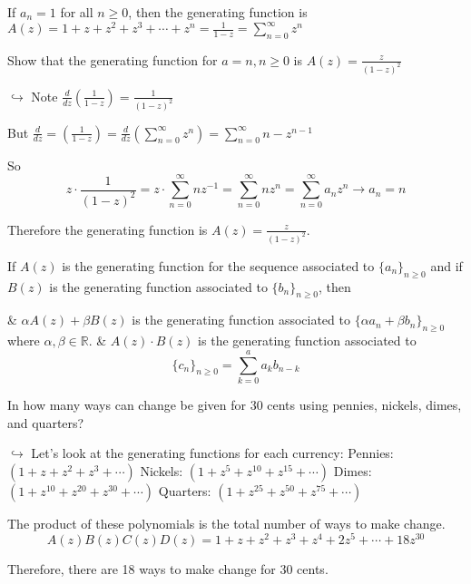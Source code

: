     \begin{ex}
        If $a_n = 1$ for all $n \ge 0$, then the generating function is $A(z) = 1 + z + z^2 + z^3 + \cdots + z^n = \frac{1}{1-z} = \sum^\infty_{n=0} z^n$
    \end{ex}

    \begin{ex}
        Show that the generating function for $a = n, n \ge 0$ is $A(z)=\frac{z}{{(1 - z)}^2}$

        $\hookrightarrow$ Note $\frac{d}{dz} \left( \frac{1}{1-z} \right) = \frac{1}{{(1 - z)}^2}$

        But $\frac{d}{dz} = \left( \frac{1}{1-z} \right) = \frac{d}{dz} \left( \sum^\infty_{n=0} z^n \right) = \sum^\infty_{n=0} n - z^{n - 1}$

        So
            \[
                z \cdot \frac{1}{{(1 - z)}^2} = z \cdot \sum^\infty_{n=0} nz^{-1} = \sum^\infty_{n = 0} nz^n = \sum^\infty_{n=0} a_n z^n \to a_n = n
            \]

        Therefore the generating function is $A(z) = \frac{z}{{(1 - z)}^2}$.
    \end{ex}

    \begin{thm}
        If $A(z)$ is the generating function for the sequence associated to $\{a_n\}_{n \ge 0}$ and if $B(z)$ is the generating function associated to $\{b_n\}_{n \ge 0}$, then
        \begin{easylist}[enumerate]
            & $\alpha A(z) + \beta B(z)$ is the generating function associated to $\{\alpha a_n + \beta b_n\}_{n \ge 0}$ where $\alpha, \beta \in \mathbb{R}$.
            & $A(z) \cdot B(z)$ is the generating function associated to
                \[ \{c_n\}_{n \ge 0} = \sum^a_{k=0} a_k b_{n-k} \]
        \end{easylist}
    \end{thm}

    \begin{ex}
        In how many ways can change be given for 30 cents using pennies, nickels, dimes, and quarters?

        $\hookrightarrow$ Let's look at the generating functions for each currency:
        Pennies: $(1 + z + z^2 + z^3 + \cdots)$
        Nickels: $(1 + z^5 + z^{10} + z^{15} + \cdots)$
        Dimes: $(1 + z^{10} + z^{20} + z^{30} + \cdots)$
        Quarters: $(1 + z^{25} + z^{50} + z^{75} + \cdots)$

        The product of these polynomials is the total number of ways to make change.
        \[ A(z)B(z)C(z)D(z) = 1 + z + z^2 + z^3 + z^4 + 2z^5 + \cdots + 18z^{30} \]

        Therefore, there are 18 ways to make change for 30 cents.
    \end{ex}

